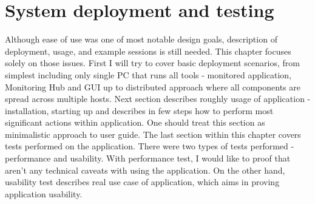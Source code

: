  
%


\chapter{System deployment and testing}
\label{cha:deployment}

\parbox{0.8\textwidth}{

{\small
Although ease of use was one of most notable design goals, description of deployment, usage, and example sessions is still needed. This chapter focuses solely on those issues. First I will try to cover basic deployment scenarios, from simplest including only single PC that runs all tools - monitored application, Monitoring Hub and GUI up to distributed approach where all components are spread across multiple hosts. Next section describes roughly usage of application - installation, starting up and describes in few steps how to perform most significant actions within application. One should treat this section as minimalistic approach to user guide. The last section within this chapter covers tests performed on the application. There were two types of tests performed - performance and usability. With performance test, I would like to proof that aren\rq{}t any technical caveats with using the application. On the other hand, usability test describes real use case of application, which aims in proving application usability.
}
}










